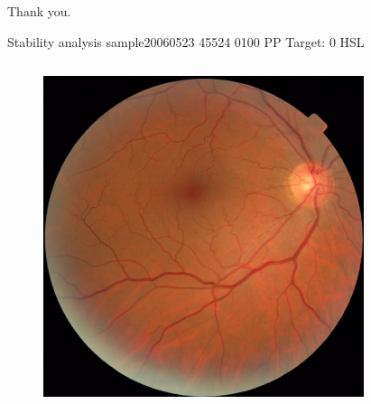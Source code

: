 \documentclass{beamer}
\begin{document}
\begin{frame}{}
\centering
\huge Thank you.
\end{frame}

\begin{frame}{Stability analysis sample}{20060523 45524 0100 PP Target: 0 HSL}
\begin{columns}
	\begin{column}{0.3\textwidth}
		\begin{figure}[p]
			\centering
			\includegraphics[width=\textwidth]{chapter_stability/20060523_45524_0100_PP/20060523_45524_0100_PP.jpeg}
		\end{figure}	
	\end{column}
	\begin{column}{0.45\textwidth}  %
		\begin{figure}[p]
			\centering

\end{figure}
\end{column}
\end{columns}
\end{frame}
\end{document}
